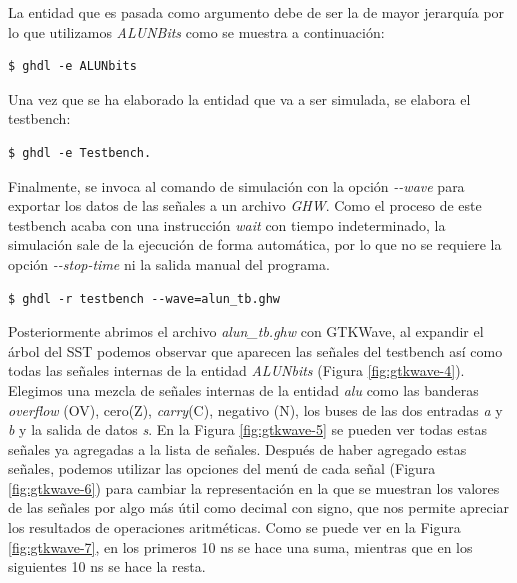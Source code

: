 \documentclass[11pt]{article}
\begin{document}
La entidad que es pasada como argumento debe de ser la de mayor jerarquía por
lo que utilizamos \textit{ALUNBits} como se muestra a continuación:

\begin{Verbatim}[frame=single]
$ ghdl -e ALUNbits
\end{Verbatim}

Una vez que se ha elaborado la entidad que va a ser simulada, se elabora el
testbench:

\begin{Verbatim}[frame=single]
$ ghdl -e Testbench.
\end{Verbatim}

Finalmente, se invoca al comando de simulación con la opción \textit{-{}-wave} para
exportar los datos de las señales a un archivo \textit{GHW}. Como el proceso de este
testbench acaba con una instrucción \textit{wait} con tiempo indeterminado, la simulación
sale de la ejecución de forma automática, por lo que no se requiere la opción
\textit{-{}-stop-time} ni la salida manual del programa.

\begin{Verbatim}[frame=single]
$ ghdl -r testbench --wave=alun_tb.ghw
\end{Verbatim}

Posteriormente abrimos el archivo \textit{alun\_tb.ghw} con GTKWave, al
expandir el árbol del SST podemos observar que aparecen las señales del
testbench así como todas las señales internas de la entidad \textit{ALUNbits}
(Figura \ref{fig:gtkwave-4}).
Elegimos una mezcla de señales internas de la entidad \textit{alu} como
las banderas \textit{overflow} (OV), cero(Z), \textit{carry}(C), negativo (N),
los buses de las dos entradas \textit{a} y \textit{b} y la salida de datos
\textit{s}. En la Figura \ref{fig:gtkwave-5} se pueden ver todas estas señales
ya agregadas a la lista de señales.
Después de haber agregado estas señales, podemos utilizar  las opciones del
menú de cada señal (Figura \ref{fig:gtkwave-6}) para cambiar la 
representación en la que se muestran los valores de las señales por algo más útil como 
decimal con signo, que nos permite apreciar los resultados de operaciones aritméticas. 
Como se puede ver en la Figura \ref{fig:gtkwave-7}, en los primeros 10
\unit{\nano\second} se hace una suma, mientras que en los siguientes 10
\unit{\nano\second} se hace la resta. 
\end{document}
